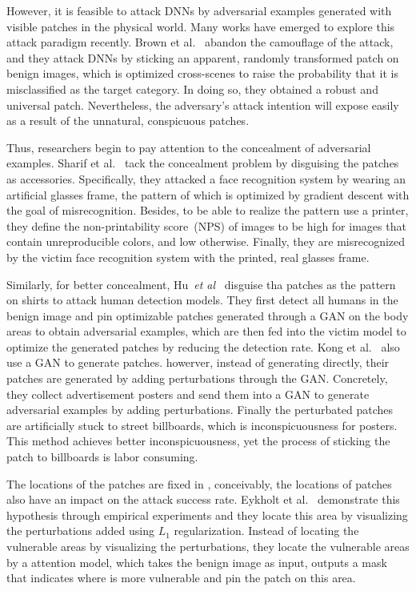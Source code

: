 \documentclass[10pt,twocolumn,letterpaper]{article}
\begin{document}
However, it is feasible to attack DNNs by adversarial 
examples generated with visible patches in the physical world.
Many works have emerged to explore this attack paradigm recently. 
Brown et al.~\cite{Brown_2017_arxiv} 
abandon the camouflage of the attack, 
and they attack DNNs by sticking an apparent, randomly transformed 
patch on benign images, which is optimized cross-scenes to raise the 
probability that it is misclassified as the target category.
In doing so, they obtained a robust and universal patch.
Nevertheless, the adversary's attack intention will expose 
easily as a result of 
the unnatural, conspicuous patches. 

Thus, researchers begin to 
pay attention to the concealment of adversarial examples.
Sharif et al.~\cite{Sharif_2017_CCS} tack the concealment 
problem by disguising the patches as accessories. 
Specifically, they attacked a face recognition 
system by wearing an artificial glasses frame,
the pattern of which is optimized by gradient 
descent with the goal of misrecognition. 
Besides, to be able to realize the pattern use a printer, 
they define the non-printability score~(NPS) of images 
to be high for images 
that contain unreproducible colors, and low otherwise. 
Finally, they are misrecognized by the victim face recognition
system with the printed, real glasses frame.

Similarly, for better concealment, 
Hu~\textit{et al}~\cite{Hu_2021_ICCV} disguise tha patches as
the pattern on shirts to attack human detection models. 
They first detect all humans in the benign image and pin   
optimizable patches generated through a GAN on the body areas 
to obtain adversarial
examples, which are then fed into the victim model to optimize
the generated patches by reducing the detection rate. 
Kong et al.~\cite{Kong_2020_CVPR} also use a GAN to generate 
patches.
howerver, instead of generating directly, their patches are 
generated by adding perturbations through the GAN.
Concretely, they collect advertisement posters and send them
into a GAN to generate adversarial examples by 
adding perturbations. Finally the perturbated patches are
artificially stuck to street billboards, which is inconspicuousness
for posters. 
This method achieves better inconspicuousness, yet 
the process of sticking the patch to billboards is labor consuming.

The locations of the patches are fixed in 
\cite{Sharif_2017_CCS, Hu_2021_ICCV,Kong_2020_CVPR}, 
conceivably, the locations of patches also have an impact 
on the attack success rate. 
Eykholt et al.~\cite{Eykholt_2018_CVPR} demonstrate this 
hypothesis through empirical experiments and they locate this 
area by visualizing the perturbations added using 
$L_1$ regularization. 
Instead of locating the vulnerable areas by visualizing 
the perturbations, 
they locate the vulnerable areas by a attention model, 
which takes the 
benign image as input, outputs a mask that indicates where 
is more vulnerable and pin the patch on this area. 
\end{document}
